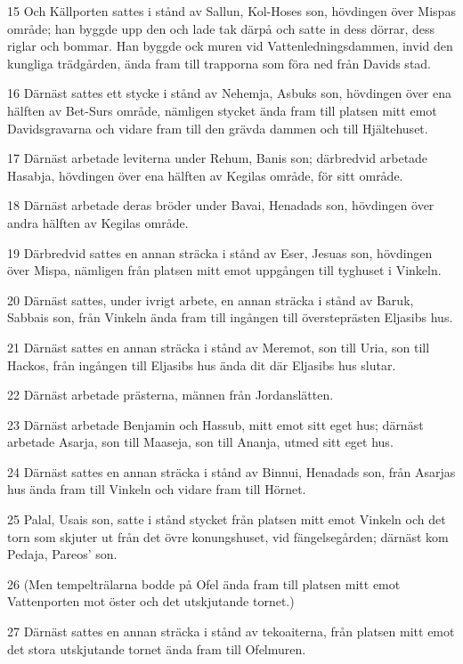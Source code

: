\par 15 Och Källporten sattes i stånd av Sallun, Kol-Hoses son, hövdingen över Mispas område; han byggde upp den och lade tak därpå och satte in dess dörrar, dess riglar och bommar. Han byggde ock muren vid Vattenledningsdammen, invid den kungliga trädgården, ända fram till trapporna som föra ned från Davids stad.
\par 16 Därnäst sattes ett stycke i stånd av Nehemja, Asbuks son, hövdingen över ena hälften av Bet-Surs område, nämligen stycket ända fram till platsen mitt emot Davidsgravarna och vidare fram till den grävda dammen och till Hjältehuset.
\par 17 Därnäst arbetade leviterna under Rehum, Banis son; därbredvid arbetade Hasabja, hövdingen över ena hälften av Kegilas område, för sitt område.
\par 18 Därnäst arbetade deras bröder under Bavai, Henadads son, hövdingen över andra hälften av Kegilas område.
\par 19 Därbredvid sattes en annan sträcka i stånd av Eser, Jesuas son, hövdingen över Mispa, nämligen från platsen mitt emot uppgången till tyghuset i Vinkeln.
\par 20 Därnäst sattes, under ivrigt arbete, en annan sträcka i stånd av Baruk, Sabbais son, från Vinkeln ända fram till ingången till översteprästen Eljasibs hus.
\par 21 Därnäst sattes en annan sträcka i stånd av Meremot, son till Uria, son till Hackos, från ingången till Eljasibs hus ända dit där Eljasibs hus slutar.
\par 22 Därnäst arbetade prästerna, männen från Jordanslätten.
\par 23 Därnäst arbetade Benjamin och Hassub, mitt emot sitt eget hus; därnäst arbetade Asarja, son till Maaseja, son till Ananja, utmed sitt eget hus.
\par 24 Därnäst sattes en annan sträcka i stånd av Binnui, Henadads son, från Asarjas hus ända fram till Vinkeln och vidare fram till Hörnet.
\par 25 Palal, Usais son, satte i stånd stycket från platsen mitt emot Vinkeln och det torn som skjuter ut från det övre konungshuset, vid fängelsegården; därnäst kom Pedaja, Pareos' son.
\par 26 (Men tempelträlarna bodde på Ofel ända fram till platsen mitt emot Vattenporten mot öster och det utskjutande tornet.)
\par 27 Därnäst sattes en annan sträcka i stånd av tekoaiterna, från platsen mitt emot det stora utskjutande tornet ända fram till Ofelmuren.
